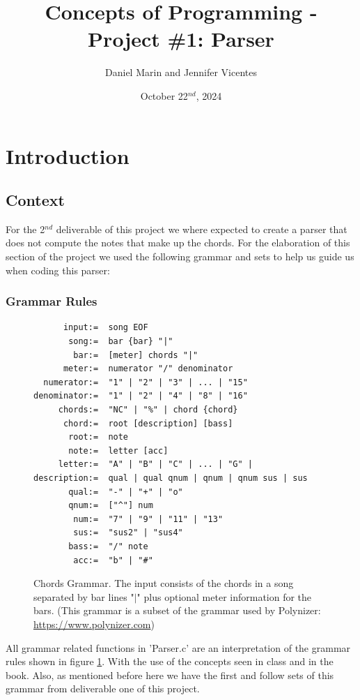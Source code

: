 \documentclass{article}
\title{Concepts of Programming - Project \#1: Parser}
\author{Daniel Marin and Jennifer Vicentes}
\date{October 22$^{nd}$, 2024}
\begin{document}
\maketitle
\tableofcontents
\newpage
\section{Introduction}
\subsection{Context}
For the 2$^{nd}$ deliverable of this project we where expected to create a parser that does not compute the notes that make up the chords. For the elaboration of this section of the project we used the following grammar and sets to help us guide us when coding this parser:
\subsubsection{Grammar Rules}
\begin{figure}[H]
    \centering
    \begin{lstlisting}
      input:=  song EOF
       song:=  bar {bar} "|"
        bar:=  [meter] chords "|"
      meter:=  numerator "/" denominator
  numerator:=  "1" | "2" | "3" | ... | "15"
denominator:=  "1" | "2" | "4" | "8" | "16"
     chords:=  "NC" | "%" | chord {chord}
      chord:=  root [description] [bass]
       root:=  note
       note:=  letter [acc]
     letter:=  "A" | "B" | "C" | ... | "G" |
description:=  qual | qual qnum | qnum | qnum sus | sus
       qual:=  "-" | "+" | "o"
       qnum:=  ["^"] num
        num:=  "7" | "9" | "11" | "13"
        sus:=  "sus2" | "sus4"
       bass:=  "/" note
        acc:=  "b" | "#"
    \end{lstlisting}
    \caption{Chords Grammar. The input consists of the chords in a song separated by bar lines "$|$" plus optional meter information for the bars. (This grammar is a subset of the grammar used by Polynizer: \url{https://www.polynizer.com})}
    \label{fig:Grammar}
\end{figure} 
All grammar related functions in 'Parser.c' are an interpretation of the grammar rules shown in figure \ref*{fig:Grammar}. With the use of the concepts seen in class and in the book. Also, as mentioned before here we have the first and follow sets of this grammar from deliverable one of this project.
\end{document}
